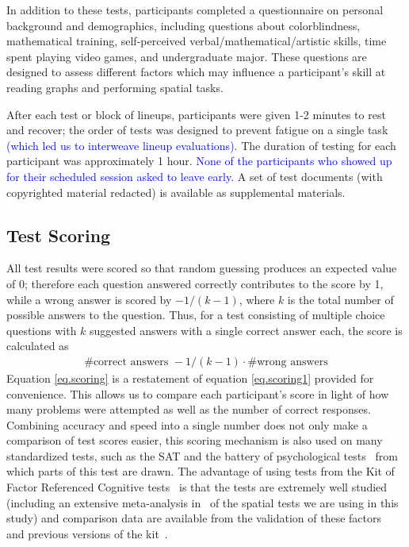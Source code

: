 \documentclass[journal]{vgtc}\usepackage[]{graphicx}\usepackage[]{color}
\newcommand{\newtext}[1]{\textcolor{blue}{#1}}
\begin{document}
In addition to these tests, participants completed a questionnaire on personal background and demographics, including questions about colorblindness, mathematical training, self-perceived verbal/mathematical/artistic skills, time spent playing video games, and undergraduate major. These questions are designed to assess different factors which may influence a participant's skill at reading graphs and performing spatial tasks. 

After each test or block of lineups, participants were given 1-2 minutes to rest and recover; the order of tests was designed to prevent fatigue on a single task \newtext{(which led us to interweave lineup evaluations)}. The duration of testing for each participant was approximately 1 hour. \newtext{None of the participants who showed up for their scheduled session asked to leave early.} A set of test documents (with copyrighted material redacted) is available as supplemental materials. 

\subsection{Test Scoring}\label{sec:scaling}
%
All test results were scored so that random guessing produces an expected value of 0; therefore each question answered correctly contributes to the score by 1, while a wrong answer is scored by $-1/(k-1)$, where $k$ is the total number of possible answers to the question. Thus, for a test consisting of multiple choice questions with $k$ suggested answers with a single correct answer each, the score is calculated as
\begin{eqnarray}\label{eq.scoring}
\# \text{correct answers } - 1/(k-1) \cdot \# \text{wrong answers}
\end{eqnarray}
Equation \ref{eq.scoring} is a restatement of equation \ref{eq.scoring1} provided for convenience.
This allows us to compare each participant's score in light of how many problems were attempted as well as the number of correct responses. Combining accuracy and speed into a single number does not only make a comparison of test scores easier,  this scoring mechanism is also used on many standardized tests, such as the SAT and the battery of psychological tests~\cite{diamond1973correction, ekstrom1976manual} from which parts of this test are drawn. The advantage of using tests from the Kit of Factor Referenced Cognitive tests~\cite{ekstrom1976manual} is that the tests are extremely well studied (including an extensive meta-analysis in~\cite{voyer1995magnitude} of the spatial tests we are using in this study) and comparison data are available from the validation of these factors~\cite{schaie1998longitudinal,hampson1990variations,mayer1994whom} and previous versions of the kit~\cite{educational1963kit}.
\end{document}
